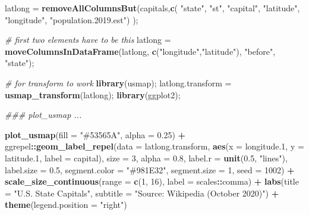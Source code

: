 \documentclass[
]{article}
\newenvironment{Shaded}{\begin{snugshade}}{\end{snugshade}}
\newcommand{\CommentTok}[1]{\textcolor[rgb]{0.56,0.35,0.01}{\textit{#1}}}
\newcommand{\DataTypeTok}[1]{\textcolor[rgb]{0.13,0.29,0.53}{#1}}
\newcommand{\DecValTok}[1]{\textcolor[rgb]{0.00,0.00,0.81}{#1}}
\newcommand{\FloatTok}[1]{\textcolor[rgb]{0.00,0.00,0.81}{#1}}
\newcommand{\KeywordTok}[1]{\textcolor[rgb]{0.13,0.29,0.53}{\textbf{#1}}}
\newcommand{\NormalTok}[1]{#1}
\newcommand{\OperatorTok}[1]{\textcolor[rgb]{0.81,0.36,0.00}{\textbf{#1}}}
\newcommand{\StringTok}[1]{\textcolor[rgb]{0.31,0.60,0.02}{#1}}
\begin{document}
\begin{Shaded}
\begin{Highlighting}[]
\NormalTok{latlong =}\StringTok{ }\KeywordTok{removeAllColumnsBut}\NormalTok{(capitals,}\KeywordTok{c}\NormalTok{( }\StringTok{"state"}\NormalTok{, }\StringTok{"st"}\NormalTok{, }\StringTok{"capital"}\NormalTok{, }\StringTok{"latitude"}\NormalTok{, }\StringTok{"longitude"}\NormalTok{, }\StringTok{"population.2019.est"}\NormalTok{) );}

\CommentTok{\# first two elements have to be this}
\NormalTok{latlong =}\StringTok{ }\KeywordTok{moveColumnsInDataFrame}\NormalTok{(latlong, }\KeywordTok{c}\NormalTok{(}\StringTok{"longitude"}\NormalTok{,}\StringTok{"latitude"}\NormalTok{), }\StringTok{"before"}\NormalTok{, }\StringTok{"state"}\NormalTok{);}

\CommentTok{\# for transform to work}
\KeywordTok{library}\NormalTok{(usmap);    }
\NormalTok{latlong.transform =}\StringTok{ }\KeywordTok{usmap\_transform}\NormalTok{(latlong);}
\KeywordTok{library}\NormalTok{(ggplot2);}

\CommentTok{\#\#\# plot\_usmap ...  }

\KeywordTok{plot\_usmap}\NormalTok{(}\DataTypeTok{fill =} \StringTok{"\#53565A"}\NormalTok{, }\DataTypeTok{alpha =} \FloatTok{0.25}\NormalTok{) }\OperatorTok{+}
\StringTok{  }\NormalTok{ggrepel}\OperatorTok{::}\KeywordTok{geom\_label\_repel}\NormalTok{(}\DataTypeTok{data =}\NormalTok{ latlong.transform,}
             \KeywordTok{aes}\NormalTok{(}\DataTypeTok{x =}\NormalTok{ longitude}\FloatTok{.1}\NormalTok{, }\DataTypeTok{y =}\NormalTok{ latitude}\FloatTok{.1}\NormalTok{, }\DataTypeTok{label =}\NormalTok{ capital),}
             \DataTypeTok{size =} \DecValTok{3}\NormalTok{, }\DataTypeTok{alpha =} \FloatTok{0.8}\NormalTok{,}
             \DataTypeTok{label.r =} \KeywordTok{unit}\NormalTok{(}\FloatTok{0.5}\NormalTok{, }\StringTok{"lines"}\NormalTok{), }\DataTypeTok{label.size =} \FloatTok{0.5}\NormalTok{,}
             \DataTypeTok{segment.color =} \StringTok{"\#981E32"}\NormalTok{, }\DataTypeTok{segment.size =} \DecValTok{1}\NormalTok{,}
             \DataTypeTok{seed =} \DecValTok{1002}\NormalTok{) }\OperatorTok{+}
\StringTok{  }\KeywordTok{scale\_size\_continuous}\NormalTok{(}\DataTypeTok{range =} \KeywordTok{c}\NormalTok{(}\DecValTok{1}\NormalTok{, }\DecValTok{16}\NormalTok{),}
                        \DataTypeTok{label =}\NormalTok{ scales}\OperatorTok{::}\NormalTok{comma) }\OperatorTok{+}
\StringTok{  }\KeywordTok{labs}\NormalTok{(}\DataTypeTok{title =} \StringTok{"U.S. State Capitals"}\NormalTok{,}
       \DataTypeTok{subtitle =} \StringTok{"Source: Wikipedia (October 2020)"}\NormalTok{) }\OperatorTok{+}
\StringTok{  }\KeywordTok{theme}\NormalTok{(}\DataTypeTok{legend.position =} \StringTok{"right"}\NormalTok{)}
\end{Highlighting}
\end{Shaded}
\end{document}

